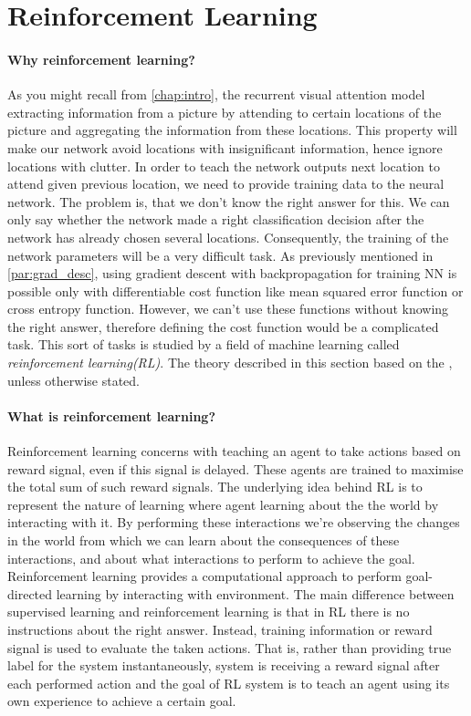 
\section{Reinforcement Learning}
\paragraph{Why reinforcement learning?}
As you might recall from \autoref{chap:intro}, the recurrent visual attention model
extracting information from a picture by attending to certain locations of the picture
and aggregating the information from these locations. This property will make our network
avoid locations with insignificant information, hence ignore locations with clutter.
In order to teach the network
outputs next location to attend given previous location, we need to provide training data to
the neural network. The problem is, that we don't know the right answer for this.
We can only say whether the network made a right classification decision after the network
has already chosen several locations. Consequently, the training of the network parameters will
be a very difficult task. As previously mentioned in \autoref{par:grad_desc}, using gradient descent
with backpropagation for training NN is possible only with differentiable cost function like
mean squared error function or cross entropy function. However, we can't use these functions without
knowing the right answer, therefore defining the cost function would be a complicated task.
This sort of tasks is studied by a field of machine learning called \emph{reinforcement
learning(\gls{RL})}. The theory described in this section based on the
\cite{Sutton2012}, unless otherwise stated.

\paragraph{What is reinforcement learning?}
Reinforcement learning concerns with teaching an agent to take actions based on
reward signal, even if this signal is delayed.
These agents are trained to maximise the total
sum of such reward signals.
The underlying idea behind \gls{RL} is to
represent the nature of learning where agent learning about the the world by interacting
with it. By performing these interactions we're observing the changes in the world
from which we can learn about the consequences of these
interactions, and about what interactions to perform to achieve the goal.
Reinforcement learning provides a computational approach to perform goal-directed learning
by interacting with environment. The main difference between supervised learning and
reinforcement learning is that in \gls{RL} there is no instructions about the right answer.
Instead, training information or reward signal is used to evaluate the taken actions.
That is, rather than providing true label for the system instantaneously,
system is receiving a reward signal
after each performed action and the goal of \gls{RL} system is to teach an agent using its own
experience to achieve a certain goal.

